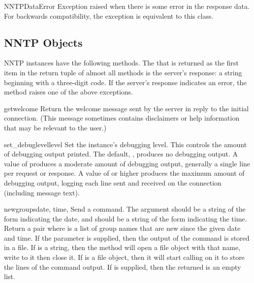\begin{classdesc}{NNTPDataError}{}
Exception raised when there is some error in the response data.  For
backwards compatibility, the exception  is
equivalent to this class.
\end{classdesc}


\subsection{NNTP Objects \label{nntp-objects}}

NNTP instances have the following methods.  The  that is
returned as the first item in the return tuple of almost all methods
is the server's response: a string beginning with a three-digit code.
If the server's response indicates an error, the method raises one of
the above exceptions.


\begin{methoddesc}{getwelcome}{}
Return the welcome message sent by the server in reply to the initial
connection.  (This message sometimes contains disclaimers or help
information that may be relevant to the user.)
\end{methoddesc}

\begin{methoddesc}{set_debuglevel}{level}
Set the instance's debugging level.  This controls the amount of
debugging output printed.  The default, , produces no debugging
output.  A value of  produces a moderate amount of debugging
output, generally a single line per request or response.  A value of
 or higher produces the maximum amount of debugging output,
logging each line sent and received on the connection (including
message text).
\end{methoddesc}

\begin{methoddesc}{newgroups}{date, time, }
Send a  command.  The  argument should be a
string of the form  indicating the
date, and  should be a string of the form
 indicating the time.  Return a pair
 where  is a list of
group names that are new since the given date and time.
If the  parameter is supplied, then the output of the 
 command is stored in a file.  If  is a string, 
then the method will open a file object with that name, write to it 
then close it.  If  is a file object, then it will start
calling  on it to store the lines of the command output.
If  is supplied, then the returned  is an empty list.
\end{methoddesc}

